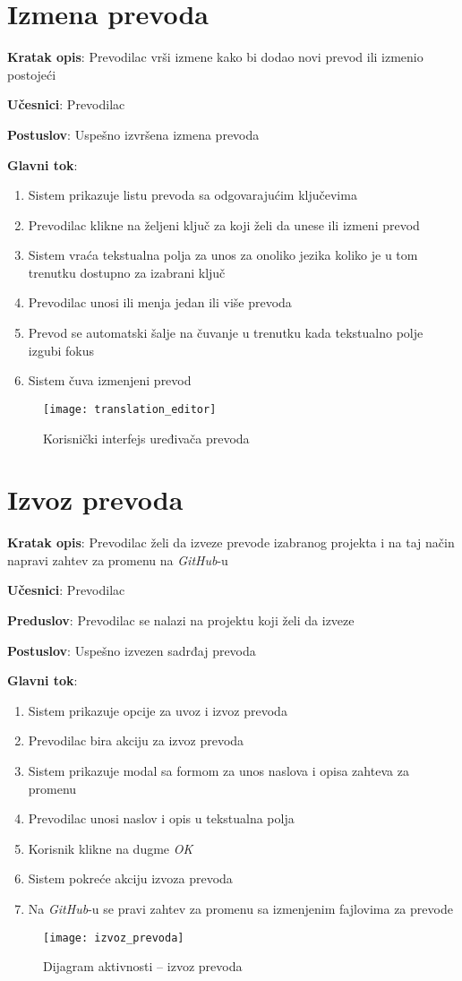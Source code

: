 \section{Izmena prevoda}

\textbf{Kratak opis}: Prevodilac vrši izmene kako bi dodao novi prevod ili izmenio postojeći

\textbf{Učesnici}: Prevodilac

\textbf{Postuslov}: Uspešno izvršena izmena prevoda

\textbf{Glavni tok}:
\begin{enumerate}
    \item Sistem prikazuje listu prevoda sa odgovarajućim ključevima
    \item Prevodilac klikne na željeni ključ za koji želi da unese ili izmeni prevod
    \item Sistem vraća tekstualna polja za unos za onoliko jezika koliko je u tom 
    trenutku dostupno za izabrani ključ
    \item Prevodilac unosi ili menja jedan ili više prevoda
    \item Prevod se automatski šalje na čuvanje u trenutku kada tekstualno polje izgubi fokus
    \item Sistem čuva izmenjeni prevod
\end{enumerate}

\begin{figure}[H]
    \centering
    \texttt{[image: translation\_editor]}
    \caption{Korisnički interfejs uređivača prevoda}
\end{figure}


\section{Izvoz prevoda}

\textbf{Kratak opis}: Prevodilac želi da izveze prevode izabranog projekta i 
na taj način napravi zahtev za promenu na \textit{GitHub}-u

\textbf{Učesnici}: Prevodilac

\textbf{Preduslov}: Prevodilac se nalazi na projektu koji želi da izveze

\textbf{Postuslov}: Uspešno izvezen sadrđaj prevoda

\textbf{Glavni tok}:
\begin{enumerate}
    \item Sistem prikazuje opcije za uvoz i izvoz prevoda
    \item Prevodilac bira akciju za izvoz prevoda
    \item Sistem prikazuje modal sa formom za unos naslova i opisa 
    zahteva za promenu
    \item Prevodilac unosi naslov i opis u tekstualna polja
    \item Korisnik klikne na dugme \textit{OK}
    \item Sistem pokreće akciju izvoza prevoda
    \item Na \textit{GitHub}-u se pravi zahtev za promenu sa izmenjenim fajlovima za prevode
\end{enumerate}

\begin{figure}[H]
    \centering
    \texttt{[image: izvoz\_prevoda]}
    \caption{Dijagram aktivnosti -- izvoz prevoda}
\end{figure}
